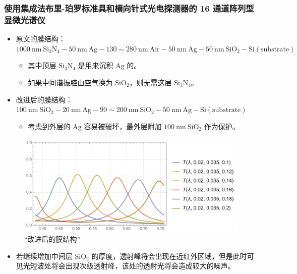 \begin{frame}[c]
    \frametitle{使用集成法布里-珀罗标准具和横向针式光电探测器的 16 通道阵列型显微光谱仪}
    \begin{itemize}
        \item 原文的膜结构：$1000 \mathrm{\ nm\ Si_3N_4} - 50 \mathrm{\ nm\ Ag} - 130\sim 280\mathrm{\ nm\ Air} - 50\mathrm{\ nm\ Ag} - 50\mathrm{\ nm\ SiO_2} - \mathrm{Si(substrate)}$
              \begin{itemize}
                  \item 其中顶层 $\mathrm{Si_3N_4}$ 是用来沉积 $\mathrm{Ag}$ 的。
                  \item 如果中间谐振腔由空气换为 $\mathrm{SiO_2}$，则无需这层 $\mathrm{Si_3N_4}$。
              \end{itemize}
        \item 改进后的膜结构：$100\mathrm{\ nm\ SiO_2} - 20 \mathrm{\ nm\ Ag} - 90\sim 200\mathrm{\ nm\ SiO_2} - 50\mathrm{\ nm\ Ag} - \mathrm{Si(substrate)}$
              \begin{itemize}
                  \item 考虑到外层的 $\mathrm{Ag}$ 容易被破坏，最外层附加 $\mathrm{100\ nm\ SiO_2}$ 作为保护。
              \end{itemize}
    \end{itemize}
    \begin{figure}[H] %
        \centering %
        \includegraphics[width=.7\textwidth]{figures/A 16-channel array-type microspectrometer using integrated Fabry-Perot etalons and lateral pin photodetectors_3.png} %
        \caption{“改进后的膜结构”} %
    \end{figure}

    \begin{itemize}
        \item 若继续增加中间层 $\mathrm{SiO_2}$ 的厚度，透射峰将会出现在近红外区域，但是此时可见光短波处将会出现次级透射峰，该处的透射光将会造成较大的噪声。
    \end{itemize}
\end{frame}